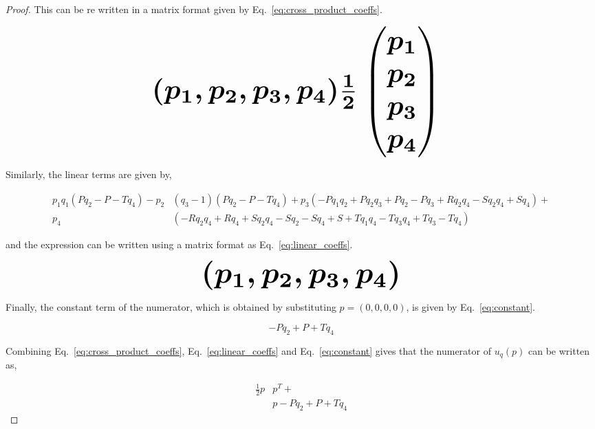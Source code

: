 \documentclass[10pt]{article}
\begin{document}
\begin{proof}
    This can be re written in a matrix format given by
    Eq.~\ref{eq:cross_product_coeffs}.

    \begin{equation}\label{eq:cross_product_coeffs}
        \resizebox{0.9\linewidth}{!}{\arraycolsep=2.5pt%
        \boldmath\(
        (p_1, p_2, p_3, p_4) \frac{1}{2}  \begin{pmatrix}
        p_1 \\
        p_2 \\
        p_3 \\
        p_4 \end{pmatrix}
        \) }
    \end{equation}

    Similarly, the linear terms are given by,

    \begingroup
    \footnotesize
    \begin{align*}
    p_{1} q_{1} (P q_{2} - P - T q_{4}) - p_{2} & (q_{3} - 1) (P q_{2} - P - T q_{4}) + p_{3} (- P q_{1} q_{2} + P q_{2} q_{3} + P q_{2} - P q_{3} + R q_{2} q_{4} - S q_{2} q_{4} + S q_{4}) + \\
    p_{4} & (- R q_{2} q_{4} + R q_{4} + S q_{2} q_{4} - S q_{2} - S q_{4} + S + T q_{1} q_{4} - T q_{3} q_{4} + T q_{3} - T q_{4})
    \end{align*}
    \endgroup

    and the expression can be written using a matrix format as
    Eq.~\ref{eq:linear_coeffs}.

    \begin{equation}\label{eq:linear_coeffs}
        \resizebox{0.60\linewidth}{!}{\arraycolsep=2.5pt%
        \boldmath\(
        (p_1, p_2, p_3, p_4) \)}
    \end{equation}

    Finally, the constant term of the numerator, which is obtained by
    substituting $p=(0, 0, 0, 0)$, is given by Eq.~\ref{eq:constant}.

    \begin{equation}\label{eq:constant}
    - P q_{2} + P + T q_{4}
    \end{equation}

    Combining Eq.~\ref{eq:cross_product_coeffs}, Eq.~\ref{eq:linear_coeffs} and
    Eq.~\ref{eq:constant} gives that the numerator of \(u_q(p)\) can be written
    as,

    \begingroup
    \tiny\boldmath
    \begin{align*}
        \frac{1}{2}p &  p^T +  \\
        &  p - P q_{2} + P + T q_{4}
    \end{align*}
    \endgroup


\end{proof}
\end{document}
